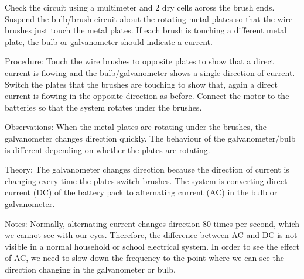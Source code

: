 \begin{multicols}{2}
\begin{description*}
{Check the circuit using a multimeter and 2 dry cells across the brush ends. Suspend the bulb/brush circuit about the rotating metal plates so that the wire brushes just touch the metal plates. If each brush is touching a different metal plate, the bulb or galvanometer should indicate a current.}
\item[Procedure:]{Touch the wire brushes to opposite plates to show that a direct current is flowing and the bulb/galvanometer shows a single direction of current. Switch the plates that the brushes are touching to show that, again a direct current is flowing in the opposite direction as before. Connect the motor to the batteries so that the system rotates under the brushes.}
\item[Observations:]{When the metal plates are rotating under the brushes, the galvanometer changes direction quickly. The behaviour of the galvanometer/bulb is different depending on whether the plates are rotating.}
\item[Theory:]{The galvanometer changes direction because the direction of current is changing every time the plates switch brushes. The system is converting direct current (DC) of the battery pack to alternating current (AC) in the bulb or galvanometer.}
\item[Notes:]{Normally, alternating current changes direction 80 times per second, which we cannot see with our eyes. Therefore, the difference between AC and DC is not visible in a normal household or school electrical system. In order to see the effect of AC, we need to slow down the frequency to the point where we can see the direction changing in the galvanometer or bulb.}
\end{description*}



\end{multicols}

\pagebreak
